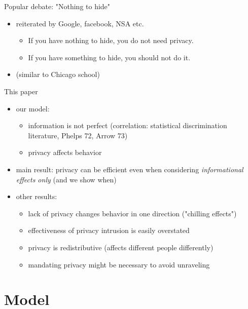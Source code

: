 \documentclass[bigger]{beamer}
\begin{document}
\begin{frame}[label={sec:orgheadline4}]{Popular debate: "Nothing to hide"}
\begin{itemize}
\item reiterated by Google, facebook, NSA etc.
\begin{itemize}
\item If you have nothing to hide, you do not need privacy.
\item If you have something to hide, you should not do it.
\end{itemize}

\item (similar to Chicago school)
\end{itemize}
\end{frame}


\begin{frame}[label={sec:orgheadline5}]{This paper}
\begin{itemize}
\item our model:
\begin{itemize}
\item information is not perfect (correlation: statistical discrimination literature, Phelps 72, Arrow 73)
\item privacy affects behavior
\end{itemize}
\item main result: privacy can be efficient even when considering \emph{informational effects only} (and we show when)
\item other results:
\begin{itemize}
\item lack of privacy changes behavior in one direction ("chilling effects")
\item effectiveness of privacy intrusion is easily overstated
\item privacy is redistributive (affects different people differently)
\item mandating privacy might be necessary to avoid unraveling
\end{itemize}
\end{itemize}
\end{frame}



\section{Model}
\label{sec:orgheadline10}
\end{document}
